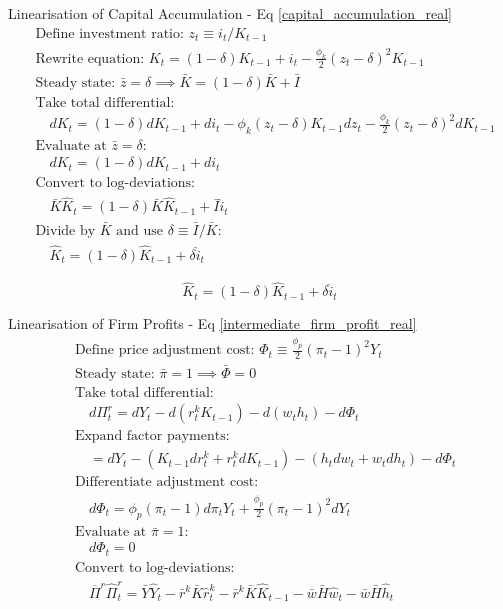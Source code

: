 \documentclass[11pt,preprint]{elsarticle}
\numberwithin{equation}{section}
\numberwithin{figure}{section}
\numberwithin{table}{section}
\begin{document}
Linearisation of Capital Accumulation - Eq
\ref{capital_accumulation_real} \begin{align*}
& \text{Define investment ratio: } z_t \equiv i_t/K_{t-1} \\[6pt]
& \text{Rewrite equation: } K_t = (1-\delta)K_{t-1} + i_t - \frac{\phi_k}{2}(z_t - \delta)^2 K_{t-1} \\[6pt]
& \text{Steady state: } \bar{z} = \delta \implies \bar{K} = (1-\delta)\bar{K} + \bar{I} \\[6pt]
& \text{Take total differential:} \\
& \quad dK_t = (1-\delta)dK_{t-1} + di_t - \phi_k(z_t - \delta)K_{t-1}dz_t - \frac{\phi_k}{2}(z_t - \delta)^2 dK_{t-1} \\[6pt]
& \text{Evaluate at } \bar{z}=\delta: \\
& \quad dK_t = (1-\delta)dK_{t-1} + di_t \\[6pt]
& \text{Convert to log-deviations:} \\
& \quad \bar{K}\hat{K}_t = (1-\delta)\bar{K}\hat{K}_{t-1} + \bar{I}\hat{i}_t \\[6pt]
& \text{Divide by } \bar{K} \text{ and use } \delta \equiv \bar{I}/\bar{K}: \\
& \quad \hat{K}_t = (1-\delta)\hat{K}_{t-1} + \delta \hat{i}_t
\end{align*}

\begin{equation}\label{capital_accumulation_real_linearised_app}
\boxed{\hat{K}_t = (1-\delta)\hat{K}_{t-1} + \delta \hat{i}_t}
\end{equation}

Linearisation of Firm Profits - Eq \ref{intermediate_firm_profit_real}
\begin{align*}
& \text{Define price adjustment cost: } \Phi_t \equiv \frac{\phi_p}{2}(\pi_t - 1)^2 Y_t \\[6pt]
& \text{Steady state: } \bar{\pi}=1 \implies \bar{\Phi}=0 \\[6pt]
& \text{Take total differential:} \\
& \quad d\Pi^r_t = dY_t - d(r^k_t K_{t-1}) - d(w_t h_t) - d\Phi_t \\[6pt]
& \text{Expand factor payments:} \\
& \quad = dY_t - (K_{t-1}dr^k_t + r^k_t dK_{t-1}) - (h_t dw_t + w_t dh_t) - d\Phi_t \\[6pt]
& \text{Differentiate adjustment cost:} \\
& \quad d\Phi_t = \phi_p(\pi_t - 1)d\pi_t Y_t + \frac{\phi_p}{2}(\pi_t - 1)^2 dY_t \\[6pt]
& \text{Evaluate at } \bar{\pi}=1: \\
& \quad d\Phi_t = 0 \\[6pt]
& \text{Convert to log-deviations:} \\
& \quad \overline{\Pi}^r \widehat{\Pi}^r_t = \bar{Y}\hat{Y}_t - \bar{r}^k\bar{K}\hat{r}^k_t - \bar{r}^k\bar{K}\hat{K}_{t-1} - \bar{w}\bar{H}\hat{w}_t - \bar{w}\bar{H}\hat{h}_t
\end{align*}
\end{document}
